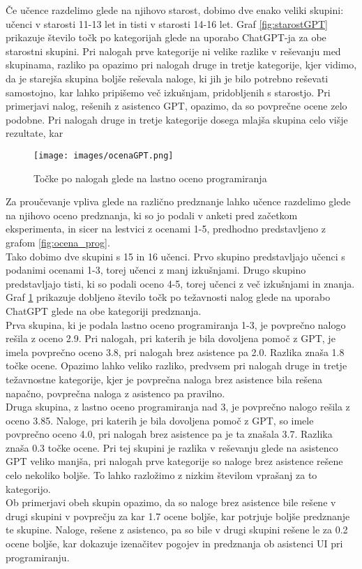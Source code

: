 \documentclass[a4paper,12pt,openright]{book}
\begin{document}
Če učence razdelimo glede na njihovo starost, dobimo dve enako veliki skupini: učenci v starosti 11-13 let in tisti v starosti 14-16 let. Graf \ref{fig:starostGPT} prikazuje število točk po kategorijah glede na uporabo ChatGPT-ja za obe starostni skupini. Pri nalogah prve kategorije ni velike razlike v reševanju med skupinama, razliko pa opazimo pri nalogah druge in tretje kategorije, kjer vidimo, da je starejša skupina boljše reševala naloge, ki jih je bilo potrebno reševati samostojno, kar lahko pripišemo več izkušnjam, pridobljenih s starostjo. Pri primerjavi nalog, rešenih z asistenco GPT, opazimo, da so povprečne ocene zelo podobne. Pri nalogah druge in tretje kategorije dosega mlajša skupina celo višje rezultate, kar \\



\pagebreak

\begin{figure}[H]
    \centering
    \texttt{[image: images/ocenaGPT.png]}
    \caption{Točke po nalogah glede na lastno oceno programiranja}
    \label{fig:ocenaGPT}
\end{figure}

Za proučevanje vpliva glede na različno predznanje lahko učence razdelimo glede na njihovo oceno predznanja, ki so jo podali v anketi pred začetkom eksperimenta, in sicer na lestvici z ocenami 1-5, predhodno predstavljeno z grafom \ref{fig:ocena_prog}. \\
Tako dobimo dve skupini s 15 in 16 učenci. Prvo skupino predstavljajo učenci s podanimi ocenami 1-3, torej učenci z manj izkušnjami. Drugo skupino predstavljajo tisti, ki so podali oceno 4-5, torej učenci z več izkušnjami in znanja. Graf \ref{fig:ocenaGPT} prikazuje dobljeno število točk po težavnosti nalog glede na uporabo ChatGPT glede na obe kategoriji predznanja. \\
Prva skupina, ki je podala lastno oceno programiranja 1-3, je povprečno nalogo rešila z oceno 2.9. Pri nalogah, pri katerih je bila dovoljena pomoč z GPT, je imela povprečno oceno 3.8, pri nalogah brez asistence pa 2.0. Razlika znaša 1.8 točke ocene. Opazimo lahko veliko razliko, predvsem pri nalogah druge in tretje težavnostne kategorije, kjer je povprečna naloga brez asistence bila rešena napačno, povprečna naloga z asistenco pa pravilno. \\
Druga skupina, z lastno oceno programiranja nad 3, je povprečno nalogo rešila z oceno 3.85. Naloge, pri katerih je bila dovoljena pomoč z GPT, so imele povprečno oceno 4.0, pri nalogah brez asistence pa je ta znašala 3.7. Razlika znaša 0.3 točke ocene. Pri tej skupini je razlika v reševanju glede na asistenco GPT veliko manjša, pri nalogah prve kategorije so naloge brez asistence rešene celo nekoliko boljše. To lahko razložimo z nizkim številom vprašanj za to kategorijo. \\
Ob primerjavi obeh skupin opazimo, da so naloge brez asistence bile rešene v drugi skupini v povprečju za kar 1.7 ocene boljše, kar potrjuje boljše predznanje te skupine. Naloge, rešene z asistenco, pa so bile v drugi skupini rešene le za 0.2 ocene boljše, kar dokazuje izenačitev pogojev in predznanja ob asistenci UI pri programiranju.
\end{document}
